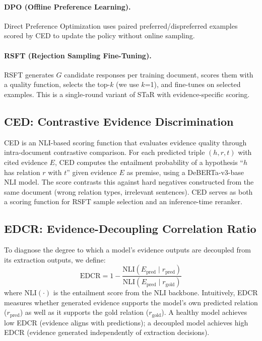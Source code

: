 \documentclass[11pt,a4paper]{article}
\newcommand{\edcr}{EDCR}
\newcommand{\ced}{CED}
\begin{document}
\paragraph{DPO (Offline Preference Learning).}
Direct Preference Optimization \cite{rafailov2024direct} uses paired preferred/dispreferred examples scored by \ced{} to update the policy without online sampling.

\paragraph{RSFT (Rejection Sampling Fine-Tuning).}
RSFT generates $G$ candidate responses per training document, scores them with a quality function, selects the top-$k$ (we use $k$=1), and fine-tunes on selected examples.
This is a single-round variant of STaR \cite{zelikman2022star} with evidence-specific scoring.

\subsection{CED: Contrastive Evidence Discrimination}
\label{sec:ced}

\ced{} is an NLI-based scoring function that evaluates evidence quality through intra-document contrastive comparison.
For each predicted triple $(h, r, t)$ with cited evidence $E$, \ced{} computes the entailment probability of a hypothesis ``$h$ has relation $r$ with $t$'' given evidence $E$ as premise, using a DeBERTa-v3-base NLI model.
The score contrasts this against hard negatives constructed from the same document (wrong relation types, irrelevant sentences).
\ced{} serves as both a scoring function for RSFT sample selection and an inference-time reranker.

\subsection{EDCR: Evidence-Decoupling Correlation Ratio}
\label{sec:edcr}

To diagnose the degree to which a model's evidence outputs are decoupled from its extraction outputs, we define:
\begin{equation}
    \text{EDCR} = 1 - \frac{\text{NLI}(E_{\text{pred}} \mid r_{\text{pred}})}{\text{NLI}(E_{\text{pred}} \mid r_{\text{gold}})}
\end{equation}
where $\text{NLI}(\cdot)$ is the entailment score from the NLI backbone.
Intuitively, \edcr{} measures whether generated evidence supports the model's own predicted relation ($r_{\text{pred}}$) as well as it supports the gold relation ($r_{\text{gold}}$).
A healthy model achieves low \edcr{} (evidence aligns with predictions); a decoupled model achieves high \edcr{} (evidence generated independently of extraction decisions).
\end{document}
